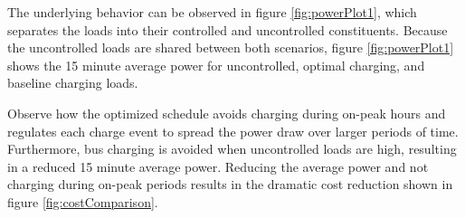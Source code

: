 	\par The underlying behavior can be observed in figure \ref{fig:powerPlot1}, which separates the loads into their controlled and uncontrolled constituents. Because the uncontrolled loads are shared between both scenarios, figure \ref{fig:powerPlot1} shows the 15 minute average power for uncontrolled, optimal charging, and baseline charging loads. 
	\par Observe how the optimized schedule avoids charging during on-peak hours and regulates each charge event to spread the power draw over larger periods of time. Furthermore, bus charging is avoided when uncontrolled loads are high, resulting in a reduced 15 minute average power.  Reducing the average power and not charging during on-peak periods results in the dramatic cost reduction shown in figure \ref{fig:costComparison}.

\begin{figure*}
	\centering
	\caption{15-Minute AVerage Power for one day}
	\label{fig:totalPower1}
\end{figure*} 
\begin{figure*}
	\centering
	\caption{Comparison between uncontrolled and bus loads}
	\label{fig:powerPlot1}
\end{figure*}

